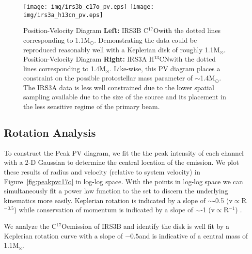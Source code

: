 \documentclass[preprint,12pt]{aastex62}
\newcommand{\htcn}{H$^{13}$CN}
\newcommand{\cso}{C$^{17}$O}
\newcommand{\ab}{$\sim$}
\newcommand{\solm}{M$_{\odot}$}
\begin{document}
\begin{figure}[H]
\begin{center}
\texttt{[image: img/irs3b\_c17o\_pv.eps]}
\texttt{[image: img/irs3a\_h13cn\_pv.eps]}
\end{center}
\caption{Position-Velocity Diagram \textbf{Left:} IRS3B \cso\space with the dotted lines corresponding to 1.1\solm. Demonstrating the data could be reproduced reasonably well with a Keplerian disk of roughly 1.1\solm. Position-Velocity Diagram \textbf{Right:} IRS3A \htcn\space with the dotted lines corresponding to 1.4\solm. Like-wise, this PV diagram places a constraint on the possible protostellar mass parameter of \ab1.4\solm. The IRS3A data is less well constrained due to the lower spatial sampling available due to the size of the source and its placement in the less sensitive regime of the primary beam.}\label{fig:l1448npv}
\end{figure}

\subsection{Rotation Analysis}
To construct the Peak PV diagram, we fit the the peak intensity of each channel with a 2-D Gaussian to determine the central location of the emission. We plot these results of radius and velocity (relative to system velocity) in Figure~\ref{fig:peakpvc17o} in log-log space. With the points in log-log space we can simultaneously fit a power law function to the set to discern the underlying kinematics more easily. Keplerian rotation is indicated by a slope of \ab-0.5 (v$\propto$R$^{-0.5}$) while conservation of momentum is indicated by a slope of \ab-1 (v$\propto$R$^{-1}$) \citep{2013ApJ...772...22Y,2014ApJ...796..131O}. 

We analyze the \cso\space emission of IRS3B and identify the disk is well fit by a Keplerian rotation curve with a slope of $-0.5$\space and is indicative of a central mass of 1.1\solm.
\end{document}
